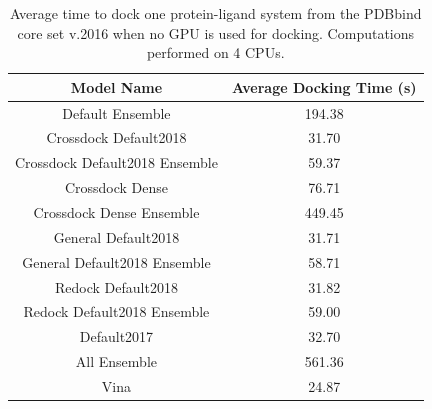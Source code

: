 \documentclass[journal=jcisd8,manuscript=article]{achemso}
\begin{document}
\begin{table}    
        \centering
        \begin{tabular}{|c|c|}
                \hline Model Name & Average Docking Time (s) \\ \hline
                Default Ensemble & 194.38\\ \hline
                Crossdock Default2018 & 31.70\\ \hline
                Crossdock Default2018 Ensemble & 59.37\\ \hline
                Crossdock Dense & 76.71\\ \hline
                Crossdock Dense Ensemble & 449.45\\ \hline
                General Default2018 & 31.71\\ \hline
                General Default2018 Ensemble & 58.71\\ \hline
                Redock Default2018 & 31.82\\ \hline
                Redock Default2018 Ensemble & 59.00\\ \hline
                Default2017 & 32.70\\ \hline
                All Ensemble & 561.36\\ \hline
                Vina & 24.87\\ \hline
        \end{tabular}    
        \caption{Average time to dock one protein-ligand system from the PDBbind core set v.2016 when no GPU is used for docking. Computations performed on 4 CPUs.}
        \label{tab:OptimalRescoreNoGPU}
\end{table}    
\end{document}
